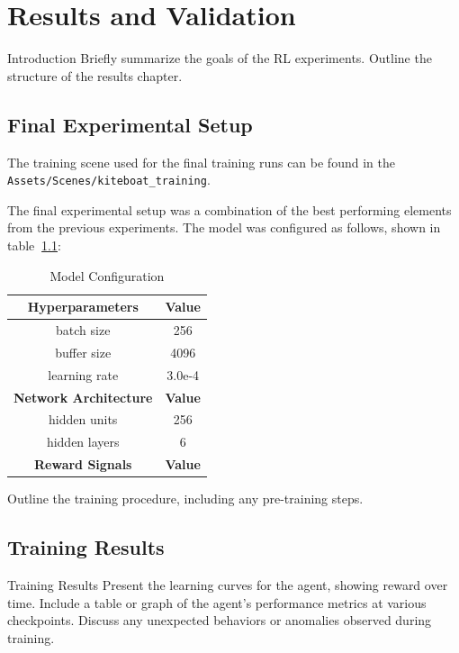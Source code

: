 

\let\textcircled=\pgftextcircled\chapter{Results and Validation}

Introduction
Briefly summarize the goals of the RL experiments.
Outline the structure of the results chapter.

\section{Final Experimental Setup}
The training scene used for the final training runs can be found in the \texttt{Assets/Scenes/kiteboat\_training}. 

The final experimental setup was a combination of the best performing elements from the previous experiments. The model was configured as follows, shown in table $~$\ref{model_config}:

\begin{table}[h]
    \centering
    \begin{tabular}{c|c}
        \textbf{Hyperparameters} & \textbf{Value} \\
        \midrule
        batch size & 256 \\
        buffer size & 4096 \\
        learning rate & 3.0e-4 \\

        \midrule
        \textbf{Network Architecture} & \textbf{Value} \\
        \midrule
        hidden units & 256 \\
        hidden layers & 6 \\
        \midrule
        \textbf{Reward Signals} & \textbf{Value} \\
        \midrule
        
        \hline
    \end{tabular}
    \caption{Model Configuration}\label{model_config}
\end{table}

Outline the training procedure, including any pre-training steps.

\section{Training Results}
Training Results
Present the learning curves for the agent, showing reward over time.
Include a table or graph of the agent’s performance metrics at various checkpoints.
Discuss any unexpected behaviors or anomalies observed during training.


